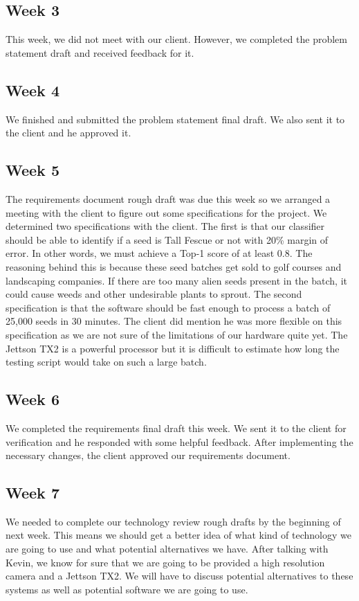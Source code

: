 \documentclass[onecolumn, draftclsnofoot,10pt, compsoc]{IEEEtran}
\begin{document}
	\subsection{Week 3}
	This week, we did not meet with our client. However, we completed the problem statement draft and received feedback for it. 
	\subsection{Week 4}
	We finished and submitted the problem statement final draft. We also sent it to the client and he approved it. 
	\subsection{Week 5}
	The requirements document rough draft was due this week so we arranged a meeting with the client to figure out some specifications for the project. We determined two specifications with the client. The first is that our classifier should be able to identify if a seed is Tall Fescue or not with 20\% margin of error. In other words, we must achieve a Top-1 score of at least 0.8. The reasoning behind this is because these seed batches get sold to golf courses and landscaping companies. If there are too many alien seeds present in the batch, it could cause weeds and other undesirable plants to sprout. The second specification is that the software should be fast enough to process a batch of 25,000 seeds in 30 minutes. The client did mention he was more flexible on this specification as we are not sure of the limitations of our hardware quite yet. The Jettson TX2 is a powerful processor but it is difficult to estimate how long the testing script would take on such a large batch.
	\subsection{Week 6}
	We completed the requirements final draft this week. We sent it to the client for verification and he responded with some helpful feedback. After implementing the necessary changes, the client approved our requirements document.
	\subsection{Week 7}
	We needed to complete our technology review rough drafts by the beginning of next week. This means we should get a better idea of what kind of technology we are going to use and what potential alternatives we have. After talking with Kevin, we know for sure that we are going to be provided a high resolution camera and a Jettson TX2. We will have to discuss potential alternatives to these systems as well as potential software we are going to use. 
\end{document}
